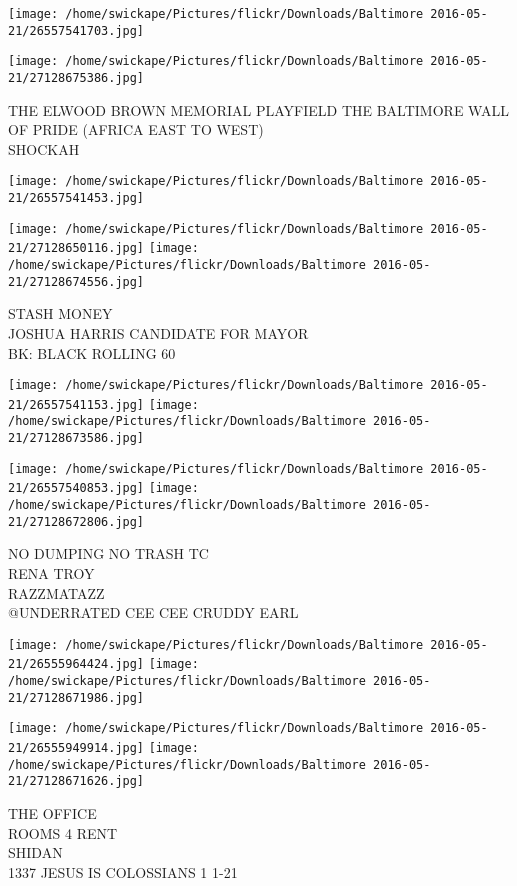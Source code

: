 \documentclass[10pt,letterpaper]{article}
\begin{document}
\texttt{[image: /home/swickape/Pictures/flickr/Downloads/Baltimore 2016-05-21/26557541703.jpg]}

\vspace{0.25in}
\texttt{[image: /home/swickape/Pictures/flickr/Downloads/Baltimore 2016-05-21/27128675386.jpg]}

THE ELWOOD BROWN MEMORIAL PLAYFIELD THE BALTIMORE WALL OF PRIDE (AFRICA EAST TO WEST)\\
SHOCKAH
\pagebreak

\texttt{[image: /home/swickape/Pictures/flickr/Downloads/Baltimore 2016-05-21/26557541453.jpg]}

\vspace{0.25in}
\texttt{[image: /home/swickape/Pictures/flickr/Downloads/Baltimore 2016-05-21/27128650116.jpg]}
\texttt{[image: /home/swickape/Pictures/flickr/Downloads/Baltimore 2016-05-21/27128674556.jpg]}

STASH MONEY\\
JOSHUA HARRIS CANDIDATE FOR MAYOR\\
BK: BLACK ROLLING 60
\pagebreak

\texttt{[image: /home/swickape/Pictures/flickr/Downloads/Baltimore 2016-05-21/26557541153.jpg]}
\texttt{[image: /home/swickape/Pictures/flickr/Downloads/Baltimore 2016-05-21/27128673586.jpg]}

\texttt{[image: /home/swickape/Pictures/flickr/Downloads/Baltimore 2016-05-21/26557540853.jpg]}
\texttt{[image: /home/swickape/Pictures/flickr/Downloads/Baltimore 2016-05-21/27128672806.jpg]}

NO DUMPING NO TRASH TC\\
RENA TROY\\
RAZZMATAZZ\\
@UNDERRATED CEE CEE CRUDDY EARL
\pagebreak

\texttt{[image: /home/swickape/Pictures/flickr/Downloads/Baltimore 2016-05-21/26555964424.jpg]}
\texttt{[image: /home/swickape/Pictures/flickr/Downloads/Baltimore 2016-05-21/27128671986.jpg]}

\texttt{[image: /home/swickape/Pictures/flickr/Downloads/Baltimore 2016-05-21/26555949914.jpg]}
\texttt{[image: /home/swickape/Pictures/flickr/Downloads/Baltimore 2016-05-21/27128671626.jpg]}

THE OFFICE\\
ROOMS 4 RENT\\
SHIDAN\\
1337 JESUS IS COLOSSIANS 1 1{-}21
\pagebreak
\end{document}
